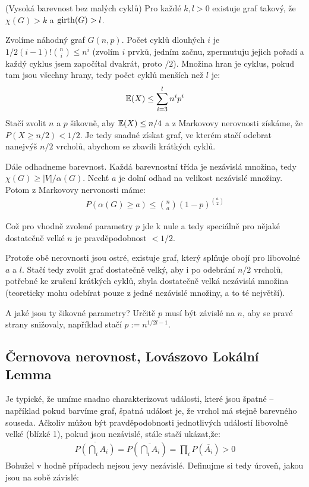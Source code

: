 \vt (Vysoká barevnost bez malých cyklů) Pro každé $k,l > 0$ existuje graf 
takový, že $\chi(G) > k$ a $\operatorname{girth}(G) > l$.

\dk Zvolíme náhodný graf $G(n,p)$. Počet cyklů dlouhých $i$ je 
$1/2(i-1)!\binom{n}{i}\leq n^i$ (zvolím $i$ prvků, jedním začnu, zpermutuju 
jejich pořadí a každý cyklus jsem započítal dvakrát, proto $/2$). Množina hran 
je cyklus, pokud tam jsou všechny hrany, tedy počet cyklů menších než $l$ je:
\begin{align}
	\mathbb{E}(X) \leq \sum_{i=3}^l n^ip^i
\end{align}
Stačí zvolit $n$ a $p$ šikovně, aby $\mathbb{E}(X) \leq n/4$ a z Markovovy nerovnosti 
získáme, že $P(X \geq n/2) < 1/2$. Je tedy snadné získat graf, ve kterém stačí 
odebrat nanejvýš $n/2$ vrcholů, abychom se zbavili krátkých cyklů.

Dále odhadneme barevnost. Každá barevnostní třída je nezávislá množina, tedy 
$\chi(G) \geq |V| / \alpha(G)$. Nechť $a$ je dolní odhad na velikost nezávislé 
množiny. Potom z Markovovy nervonosti máme:
\begin{align}
	P(\alpha(G) \geq a) \leq \binom{n}{a}(1-p)^{\binom{a}{2}}
\end{align}

Což pro vhodně zvolené parametry $p$ jde k nule a tedy speciálně pro nějaké 
dostatečně velké $n$ je pravděpodobnost $< 1/2$.

Protože obě nerovnosti jsou ostré, existuje graf, který splňuje obojí pro 
libovolné $a$ a $l$. Stačí tedy zvolit graf dostatečně velký, aby i po odebrání 
$n/2$ vrcholů, potřebné ke zrušení krátkých cyklů, zbyla dostatečně velká 
nezávislá množina (teoreticky mohu odebírat pouze z jedné nezávislé množiny, a 
to té největší).

A jaké jsou ty šikovné parametry? Určitě $p$ musí být závislé na $n$, aby se 
pravé strany snižovaly, například stačí $p := n^{1/2l -1}$.

\subsection{Černovova nerovnost, Lovászovo Lokální Lemma}

Je typické, že umíme snadno charakterizovat události, které jsou špatné -- 
například pokud barvíme graf, špatná událost je, že vrchol má stejně barevného 
souseda. Ačkoliv můžou být pravděpodobnosti jednotlivých událostí libovolně 
velké (blízké 1), pokud jsou nezávislé, stále stačí ukázat,že:
\begin{align}
	\overline{P\left(\bigcap_i A_i\right)} = P\left(\overline{\bigcap_i 
	A_i}\right) = \prod_i P(\overline{A_i})> 0
\end{align}
Bohužel v hodně případech nejsou jevy nezávislé. Definujme si tedy úroveň, jakou
jsou na sobě závislé:


